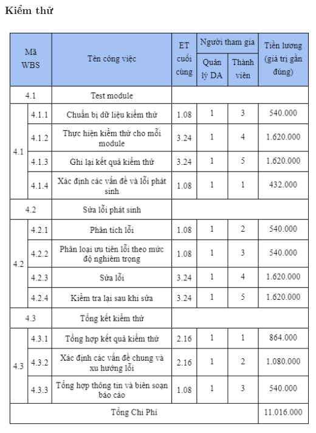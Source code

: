 \documentclass[12pt]{article}
\begin{document}
\subsubsection{Kiểm thử}
\includegraphics[width=15cm]{ChiPhi7.png}
\vspace{0.5cm}
\end{document}
